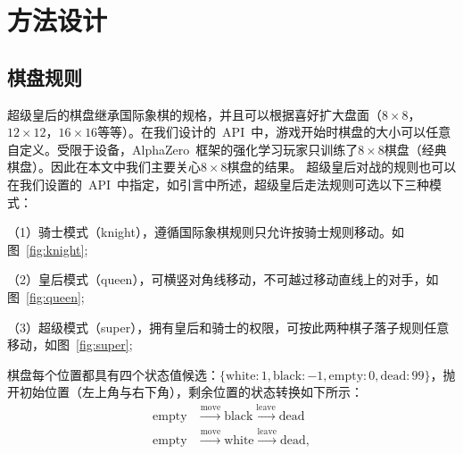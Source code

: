 \chapter{方法设计}
\label{chap:algorithm}

\section{棋盘规则}
超级皇后的棋盘继承国际象棋的规格，并且可以根据喜好扩大盘面（$8\times8$，$12\times12$，$16\times16$等等）。在我们设计的~API~中，游戏开始时棋盘的大小可以任意自定义。受限于设备，AlphaZero~框架的强化学习玩家只训练了$8\times8$棋盘（经典棋盘）。因此在本文中我们主要关心$8\times8$棋盘的结果。
超级皇后对战的规则也可以在我们设置的~API~中指定，如引言中所述，超级皇后走法规则可选以下三种模式：

（1）骑士模式（knight），遵循国际象棋规则只允许按骑士规则移动。如图~\ref{fig:knight};

（2）皇后模式（queen），可横竖对角线移动，不可越过移动直线上的对手，如图~\ref{fig:queen};

（3）超级模式（super），拥有皇后和骑士的权限，可按此两种棋子落子规则任意移动，如图~\ref{fig:super};

棋盘每个位置都具有四个状态值候选：$\{\text{white}:1, \text{black}:-1, \text{empty}:0, \text{dead}:99\}$，抛开初始位置（左上角与右下角），剩余位置的状态转换如下所示：
\begin{equation*}
    \begin{aligned}
    \text{empty} &\stackrel{\mathrm{move}}{\longrightarrow} \text{black} \stackrel{\mathrm{leave}}{\longrightarrow} \text{dead} \\
    \text{empty} &\stackrel{\mathrm{move}}{\longrightarrow} \text{white} \stackrel{\mathrm{leave}}{\longrightarrow} \text{dead},
    \end{aligned}
\end{equation*}

